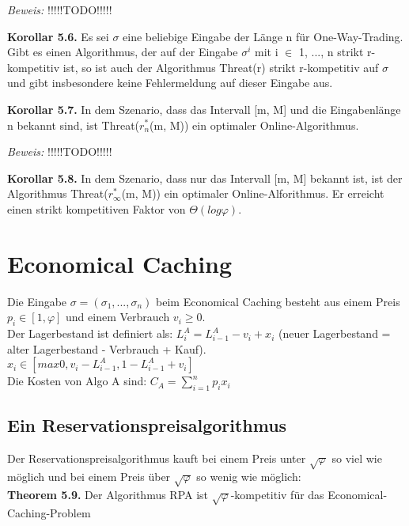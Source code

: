 \textit{Beweis:} !!!!!TODO!!!!!

\textbf{Korollar 5.6.} Es sei $\sigma$ eine beliebige Eingabe der Länge n für One-Way-Trading. Gibt es einen Algorithmus, der auf der Eingabe $\sigma^{i}$ mit i $\in$ {1, ..., n} strikt r-kompetitiv ist, so ist auch der Algorithmus Threat(r) strikt r-kompetitiv auf $\sigma$ und gibt insbesondere keine Fehlermeldung auf dieser Eingabe aus.

\textbf{Korollar 5.7.} In dem Szenario, dass das Intervall [m, M] und die Eingabenlänge n bekannt sind, ist Threat($r_{n}^{*}$(m, M)) ein optimaler Online-Algorithmus.

\textit{Beweis:} !!!!!TODO!!!!!

\textbf{Korollar 5.8.} In dem Szenario, dass nur das Intervall [m, M] bekannt ist, ist der Algorithmus Threat($r_{\infty}^{*}$(m, M)) ein optimaler Online-Alforithmus. Er erreicht einen strikt kompetitiven Faktor von $\Theta(log \varphi)$. 

\section{Economical Caching}

Die Eingabe $\sigma = (\sigma_{1}, ..., \sigma_{n})$ beim Economical Caching besteht aus einem Preis $p_{i} \in [1, \varphi]$ und einem Verbrauch $v_{i} \ge 0$.\\
Der Lagerbestand ist definiert als: $L_{i}^{A} = L_{i-1}^{A} - v_{i} + x_{i}$ (neuer Lagerbestand = alter Lagerbestand - Verbrauch + Kauf).\\
$x_{i} \in [max{0, v_{i}-L_{i-1}^{A}}, 1-L_{i-1}^{A}+v_{i}]$ \\
Die Kosten von Algo A sind: $C_{A} = \sum_{i = 1}^{n} p_{i}x_{i}$

\subsection{Ein Reservationspreisalgorithmus}

Der Reservationspreisalgorithmus kauft bei einem Preis unter $\sqrt{\varphi}$ so viel wie möglich und bei einem Preis über $\sqrt{\varphi}$ so wenig wie möglich: \\


\textbf{Theorem 5.9.} Der Algorithmus RPA ist $\sqrt{\varphi}$-kompetitiv für das Economical-Caching-Problem

